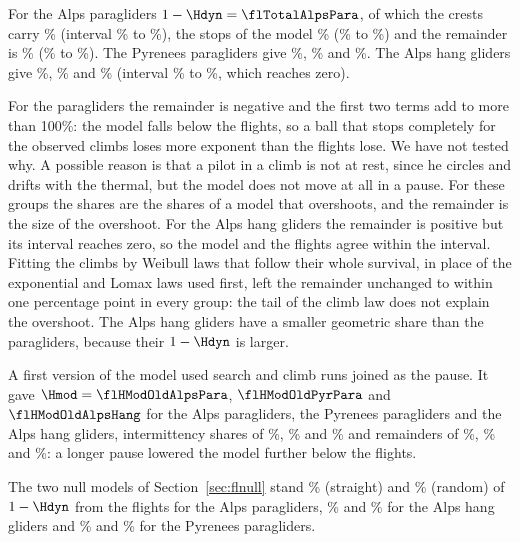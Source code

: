 For the Alps paragliders $1 - \Hdyn = \flTotalAlpsPara$, of which the crests carry \flPctGeometryAlpsPara\%
(interval \flPctGeometryAlpsParaLo\% to \flPctGeometryAlpsParaHi\%), the stops of the model
\flPctInterAlpsPara\% (\flPctInterAlpsParaLo\% to \flPctInterAlpsParaHi\%) and the remainder is
\flPctOtherAlpsPara\% (\flPctOtherAlpsParaLo\% to \flPctOtherAlpsParaHi\%). The Pyrenees paragliders give
\flPctGeometryPyrPara\%, \flPctInterPyrPara\% and \flPctOtherPyrPara\%. The Alps hang gliders give
\flPctGeometryAlpsHang\%, \flPctInterAlpsHang\% and \flPctOtherAlpsHang\% (interval \flPctOtherAlpsHangLo\% to
\flPctOtherAlpsHangHi\%, which reaches zero).

For the paragliders the remainder is negative and the first two terms add to more than 100\%: the model falls
below the flights, so a ball that stops completely for the observed climbs loses more exponent than the flights
lose. We have not tested why. A possible reason is that a pilot in a climb is not at rest, since he circles and
drifts with the thermal, but the model does not move at all in a pause. For these groups the shares are the
shares of a model that overshoots, and the remainder is the size of the overshoot. For the Alps hang gliders the
remainder is positive but its interval reaches zero, so the model and the flights agree within the interval. Fitting the climbs
by Weibull laws that follow their whole survival, in place of the exponential and Lomax laws used first, left the remainder
unchanged to within one percentage point in every group: the tail of the climb law does not explain the overshoot.
The Alps hang gliders have a smaller geometric share than the paragliders, because their $1 - \Hdyn$ is larger.

A first version of the model used search and climb runs joined as the pause. It gave $\Hmod = \flHModOldAlpsPara$,
$\flHModOldPyrPara$ and $\flHModOldAlpsHang$ for the Alps paragliders, the Pyrenees paragliders and the Alps hang
gliders, intermittency shares of \flPctInterOldAlpsPara\%, \flPctInterOldPyrPara\% and \flPctInterOldAlpsHang\%
and remainders of \flPctOtherOldAlpsPara\%, \flPctOtherOldPyrPara\% and \flPctOtherOldAlpsHang\%: a longer
pause lowered the model further below the flights.

The two null models of Section~\ref{sec:flnull} stand \flNullGapStraightAlpsPara\% (straight) and
\flNullGapRandomAlpsPara\% (random) of $1-\Hdyn$ from the flights for the Alps paragliders, \flNullGapStraightAlpsHang\% and
\flNullGapRandomAlpsHang\% for the Alps hang gliders and \flNullGapStraightPyrPara\% and \flNullGapRandomPyrPara\% for the
Pyrenees paragliders.

